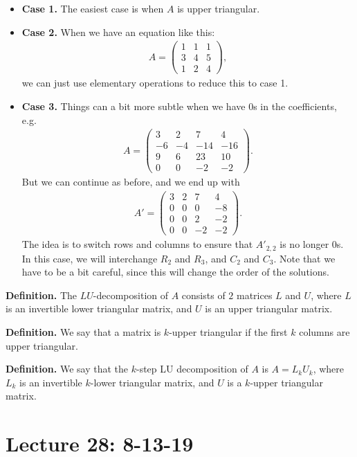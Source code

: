 \documentclass{article}
\newcommand{\mat}[1]{\begin{pmatrix}#1\end{pmatrix}}
\begin{document}
\begin{itemize}
  \item {\bf Case 1.} The easiest case is when $A$ is upper triangular.
  \item {\bf Case 2.} When we have an equation like this:
    \begin{align*}
      A = \mat{1 & 1 & 1 \\ 3 & 4 & 5 \\ 1 & 2 & 4},
    \end{align*}
    we can just use elementary operations to reduce this to case 1.
  \item {\bf Case 3.} Things can a bit more subtle when we have 0s in the coefficients, e.g.
    \begin{align*}
      A = \mat{3 & 2 & 7 & 4 \\ -6 & -4 & -14 & -16 \\ 9 & 6 & 23 & 10 \\ 0 & 0 & -2 & - 2}.
    \end{align*}
    But we can continue as before, and we end up with
    \begin{align*}
      A' = \mat{3 & 2 & 7 & 4 \\ 0 & 0 & 0 & -8 \\ 0 & 0 & 2 & -2 \\ 0 & 0 & -2 & -2}.
    \end{align*}
    The idea is to switch rows and columns to ensure that $A'_{2, 2}$ is no longer 0s.  In this case, we will interchange $R_2$ and $R_3$, and $C_2$ and $C_3$.  Note that we have to be a bit careful, since this will change the order of the solutions.
\end{itemize}

{\bf Definition.} The $LU$-decomposition of $A$ consists of $2$ matrices $L$ and $U$, where $L$ is an invertible lower triangular matrix, and $U$ is an upper triangular matrix.

{\bf Definition.} We say that a matrix is $k$-upper triangular if the first $k$ columns are upper triangular.

{\bf Definition.} We say that the $k$-step LU decomposition of $A$ is $A = L_k U_k$, where $L_k$ is an invertible $k$-lower triangular matrix, and $U$ is a $k$-upper triangular matrix.


\section{Lecture 28: 8-13-19}
\end{document}
